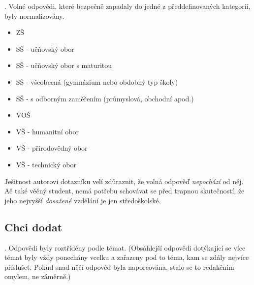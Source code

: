 \qtype \pickOne \withOther.
Volné odpovědi, které bezpečně zapadaly do jedné z předdefinovaných
kategorií, byly normalizovány.

\begin{itemize}
\item ZŠ
\item SŠ - učňovský obor
\item SŠ - učňovský obor s maturitou
\item SŠ - všeobecná (gymnázium nebo obdobný typ školy)
\item SŠ - s odborným zaměřením (průmyslová, obchodní apod.)
\item VOŠ
\item VŠ - humanitní obor
\item VŠ - přírodovědný obor
\item VŠ - technický obor
\end{itemize}


{\footnotesize
Ješitnost autorovi dotazníku velí zdůraznit, že volná
odpověď  \emph{nepochází} od něj.
Ač také věčný student, nemá potřebu schovávat se před
trapnou skutečností, že jeho nejvyšší \emph{dosažené} vzdělání
je jen středoškolské.
}

\subsection{Chci dodat}

\qtype \freeEntry.
Odpovědi byly roztříděny podle témat. (Obsáhlejší odpovědi
dotýkající se více témat byly vždy ponechány vcelku
a zařazeny pod to téma, kam se zdály nejvíce příslušet.
Pokud snad něčí odpověď byla naporcována, stalo se to redakčním
omylem, ne záměrně.)


